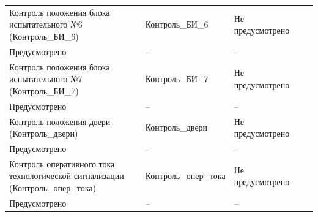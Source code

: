 \begin{longtable}{|>{\centering\arraybackslash}m{5.3cm}|>{\centering\arraybackslash}m{3.3cm}|>{\centering\arraybackslash}m{4.2cm}|>{\centering\arraybackslash}m{1.8cm}|>{\centering\arraybackslash}m{1cm}|}
\hline
\centering Контроль положения блока испытательного №6 (Контроль\_БИ\_6)  & \centering Контроль\_БИ\_6 & \centering Не предусмотрено \\ Предусмотрено & \centering -- & \centering \arraybackslash -- \\
\hline
\centering Контроль положения блока испытательного №7 (Контроль\_БИ\_7)  & \centering Контроль\_БИ\_7 & \centering Не предусмотрено \\ Предусмотрено & \centering -- & \centering \arraybackslash -- \\
\hline
\centering Контроль положения двери (Контроль\_двери)  & \centering Контроль\_двери & \centering Не предусмотрено \\ Предусмотрено & \centering -- & \centering \arraybackslash -- \\
\hline
\centering Контроль оперативного тока технологической сигнализации (Контроль\_опер\_тока)  & \centering Контроль\_опер\_тока & \centering Не предусмотрено \\ Предусмотрено & \centering -- & \centering \arraybackslash -- \\
\hline
\end{longtable}
\normalsize